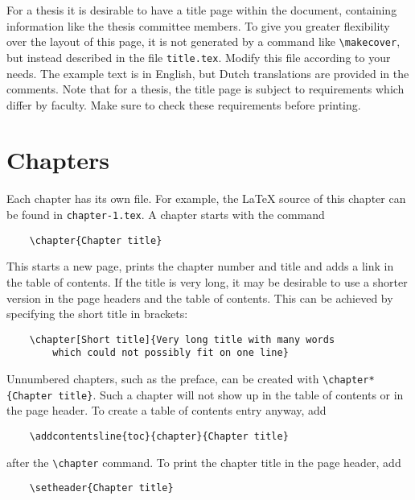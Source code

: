 For a thesis it is desirable to have a title page within the document, containing information like the thesis committee members. To give you greater flexibility over the layout of this page, it is not generated by a command like \verb|\makecover|, but instead described in the file \texttt{title.tex}. Modify this file according to your needs. The example text is in English, but Dutch translations are provided in the comments. Note that for a thesis, the title page is subject to requirements which differ by faculty. Make sure to check these requirements before printing.

\section{Chapters}

Each chapter has its own file. For example, the \LaTeX{} source of this chapter can be found in \texttt{chapter-1.tex}. A chapter starts with the command
\begin{verbatim}
    \chapter{Chapter title}
\end{verbatim}
This starts a new page, prints the chapter number and title and adds a link in the table of contents. If the title is very long, it may be desirable to use a shorter version in the page headers and the table of contents. This can be achieved by specifying the short title in brackets:
\begin{verbatim}
    \chapter[Short title]{Very long title with many words 
        which could not possibly fit on one line}
\end{verbatim}
Unnumbered chapters, such as the preface, can be created with \verb|\chapter*{Chapter title}|. Such a chapter will not show up in the table of contents or in the page header. To create a table of contents entry anyway, add
\begin{verbatim}
    \addcontentsline{toc}{chapter}{Chapter title}
\end{verbatim}
after the \verb|\chapter| command. To print the chapter title in the page header, add
\begin{verbatim}
    \setheader{Chapter title}
\end{verbatim}

